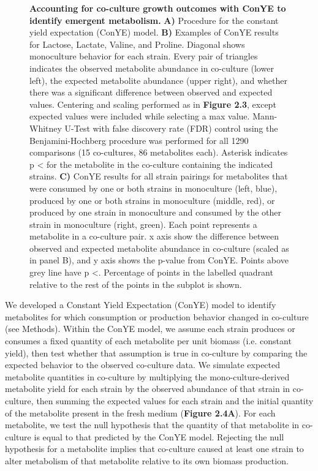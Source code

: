 \documentclass[11pt,twocolumn,notitlepage,openany,twoside]{book}
\begin{document}
\begin{refsection}
\begin{figure}[tb!]
\caption[Accounting for co-culture growth outcomes with ConYE to identify emergent metabolism.]{\textbf{Accounting for co-culture growth outcomes with ConYE to identify emergent metabolism.} \textbf{A)} Procedure for the constant yield expectation (ConYE) model. \textbf{B)} Examples of ConYE results for Lactose, Lactate, Valine, and Proline. Diagonal shows monoculture behavior for each strain. Every pair of triangles indicates the observed metabolite abundance in co-culture (lower left), the expected metabolite abundance (upper right), and whether there was a significant difference between observed and expected values. Centering and scaling performed as in \textbf{Figure 2.3}, except expected values were included while selecting a max value. Mann-Whitney U-Test with false discovery rate (FDR) control using the Benjamini-Hochberg procedure was performed for all 1290 comparisons (15 co-cultures, 86 metabolites each). Asterisk indicates p \textless{} for the metabolite in the co-culture containing the indicated strains. \textbf{C)} ConYE results for all strain pairings for metabolites that were consumed by one or both strains in monoculture (left, blue), produced by one or both strains in monoculture (middle, red), or produced by one strain in monoculture and consumed by the other strain in monoculture (right, green). Each point represents a metabolite in a co-culture pair. x axis show the difference between observed and expected metabolite abundance in co-culture (scaled as in panel B), and y axis shows the p-value from ConYE. Points above grey line have p \textless{}. Percentage of points in the labelled quadrant relative to the rest of the points in the subplot is shown.}
\end{figure}

We developed a Constant Yield Expectation (ConYE) model to identify metabolites for which consumption or production behavior changed in co-culture (see Methods). Within the ConYE model, we assume each strain produces or consumes a fixed quantity of each metabolite per unit biomass (i.e. constant yield), then test whether that assumption is true in co-culture by comparing the expected behavior to the observed co-culture data. We simulate expected metabolite quantities in co-culture by multiplying the mono-culture-derived metabolite yield for each strain by the observed abundance of that strain in co-culture, then summing the expected values for each strain and the initial quantity of the metabolite present in the fresh medium (\textbf{Figure 2.4A}). For each metabolite, we test the null hypothesis that the quantity of that metabolite in co-culture is equal to that predicted by the ConYE model. Rejecting the null hypothesis for a metabolite implies that co-culture caused at least one strain to alter metabolism of that metabolite relative to its own biomass production.


\end{refsection}
\end{document}
